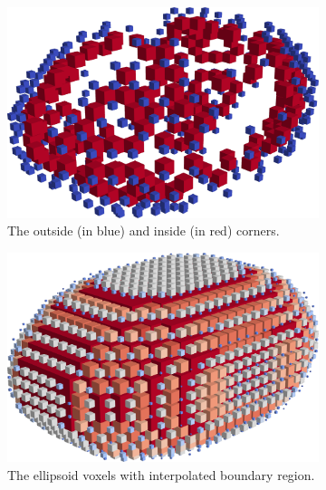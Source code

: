 \documentclass[a4paper,10pt]{report}
\begin{document}
\begin{figure}[H]
    \centering
    \begin{subfigure}{.32\textwidth}
        \includegraphics[width=\textwidth]{../images/3D/Ellipsoid_blocks_isolated_vertices.png}
    \caption{The outside (in blue) and inside (in red) corners.}
    \label{fig:Ellipsoid_blocks_isolated_vertices}
    \end{subfigure}
    \hfill
    \begin{subfigure}{.32\textwidth}
        \includegraphics[width=\textwidth]{../images/3D/Ellipsoid_blocks_isolated_vertices_interpolated.png}
    \caption{The ellipsoid voxels with interpolated boundary region.}
    \label{fig:Ellipsoid_blocks_isolated_vertices_interpolated}
    \end{subfigure}
    \hfill
    \begin{subfigure}{.32\textwidth}

\end{subfigure}
\end{figure}
\end{document}
